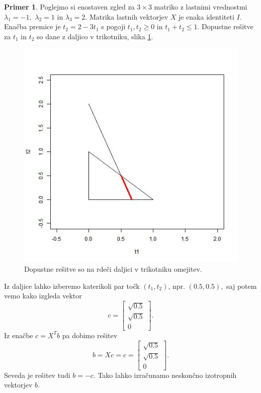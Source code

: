 \documentclass[12pt,a4paper]{amsart}
\theoremstyle{definition}
\newtheorem{primer}[definicija]{Primer}
\theoremstyle{plain}
\begin{document}
\begin{primer}
Poglejmo si enostaven zgled za $3\times 3$ matriko z lastnimi vrednostmi $\lambda_1=-1,$ $\lambda_2=1$ in $\lambda_3=2$. Matrika lastnih vektorjev $X$ je enaka identiteti $I$.\\
Enačba premice je $t_2=2-3t_1$ s pogoji $t_1, t_2 \ge 0$ in $t_1+t_2\le 1$. Dopustne rešitve za $t_1$ in $t_2$ so dane z daljico v trikotniku, slika \ref{fig:daljica}.\\
\begin{figure}[h]
\centering
\includegraphics[scale=0.4]{graf3.jpg}
\caption{Dopustne rešitve so na rdeči daljici v trikotniku omejitev.}
\label{fig:daljica}
\end{figure}

Iz daljice lahko izberemo katerikoli par točk $(t_1, t_2)$, npr. $(0.5, 0.5),$ saj potem vemo kako izgleda vektor 
$$c=\begin{bmatrix}
\sqrt{0.5}\\
\sqrt{0.5}\\
0
\end{bmatrix}.$$ 
Iz enačbe $c=X^T b$ pa dobimo rešitev
$$b=Xc=c =\begin{bmatrix}
\sqrt{0.5}\\
\sqrt{0.5}\\
0
\end{bmatrix}.$$
Seveda je rešitev tudi $b=-c$. Tako lahko izračunamo neskončno izotropnih vektorjev $b$.
\end{primer}
\end{document}
